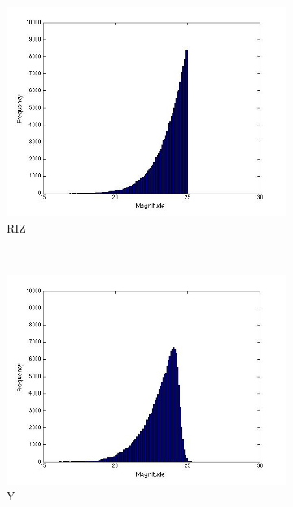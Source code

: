 \documentclass[useAMS,usenatbib,fleqn]{mn2e}
\begin{document}
\begin{figure}
        \begin{subfigure}[b]{0.2\textwidth}
                \includegraphics[trim = 35px 15px 50px 25px, clip=true,width=\textwidth]{RIZ.jpg}
                \caption{RIZ}
        \end{subfigure}
        ~
        \begin{subfigure}[b]{0.2\textwidth}
                \includegraphics[trim = 35px 15px 50px 25px, clip=true,width=\textwidth]{Y.jpg}
                \caption{Y}
        \end{subfigure}
         ~
        \begin{subfigure}[b]{0.2\textwidth}

\end{subfigure}
\end{figure}
\end{document}
